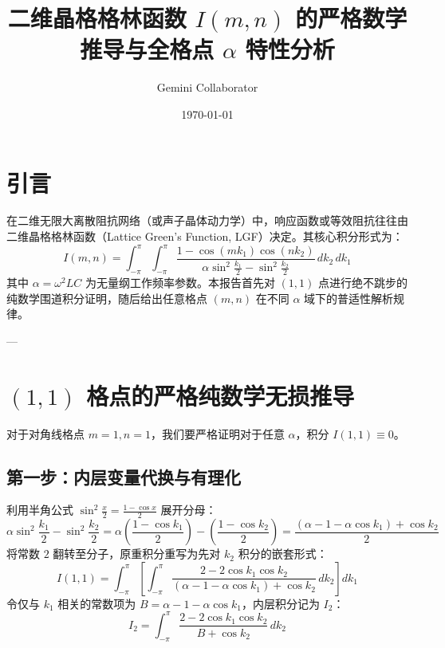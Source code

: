 \documentclass[12pt,a4paper]{ctexart}
\title{二维晶格格林函数 $I(m,n)$ 的严格数学推导与全格点 $\alpha$ 特性分析}
\author{Gemini Collaborator}
\date{\today}
\begin{document}
\maketitle

\section{引言}
在二维无限大离散阻抗网络（或声子晶体动力学）中，响应函数或等效阻抗往往由二维晶格格林函数（Lattice Green's Function, LGF）决定。其核心积分形式为：
\begin{equation}
I(m,n) = \int_{-\pi}^{\pi} \int_{-\pi}^{\pi} \frac{1 - \cos(m k_1)\cos(n k_2)}{\alpha \sin^2\frac{k_1}{2} - \sin^2\frac{k_2}{2}} \, dk_2 \, dk_1
\end{equation}
其中 $\alpha = \omega^2 LC$ 为无量纲工作频率参数。本报告首先对 $(1,1)$ 点进行绝不跳步的纯数学围道积分证明，随后给出任意格点 $(m,n)$ 在不同 $\alpha$ 域下的普适性解析规律。

---

\section{$(1,1)$ 格点的严格纯数学无损推导}
对于对角线格点 $m=1, n=1$，我们要严格证明对于任意 $\alpha$，积分 $I(1,1) \equiv 0$。

\subsection{第一步：内层变量代换与有理化}
利用半角公式 $\sin^2\frac{x}{2} = \frac{1-\cos x}{2}$ 展开分母：
\begin{equation}
\alpha \sin^2\frac{k_1}{2} - \sin^2\frac{k_2}{2} = \alpha \left(\frac{1-\cos k_1}{2}\right) - \left(\frac{1-\cos k_2}{2}\right) = \frac{(\alpha - 1 - \alpha \cos k_1) + \cos k_2}{2}
\end{equation}
将常数 $2$ 翻转至分子，原重积分重写为先对 $k_2$ 积分的嵌套形式：
\begin{equation}
I(1,1) = \int_{-\pi}^{\pi} \left[ \int_{-\pi}^{\pi} \frac{2 - 2\cos k_1 \cos k_2}{(\alpha - 1 - \alpha \cos k_1) + \cos k_2} \, dk_2 \right] dk_1
\end{equation}
令仅与 $k_1$ 相关的常数项为 $B = \alpha - 1 - \alpha \cos k_1$，内层积分记为 $I_2$：
\begin{equation}
I_2 = \int_{-\pi}^{\pi} \frac{2 - 2\cos k_1 \cos k_2}{B + \cos k_2} \, dk_2
\end{equation}
\end{document}
